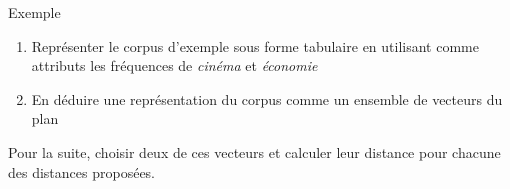 \documentclass[hyperref={unicode}, xcolor={svgnames}, french]{beamer}
\begin{document}
\begin{frame}{Exemple}
	\begin{enumerate}
		\item Représenter le corpus d'exemple sous forme tabulaire en utilisant comme attributs les fréquences de \emph{cinéma} et \emph{économie}
		\item En déduire une représentation du corpus comme un ensemble de vecteurs du plan
	\end{enumerate}
	Pour la suite, choisir deux de ces vecteurs et calculer leur distance pour chacune des distances proposées.
\end{frame}

\end{document}
